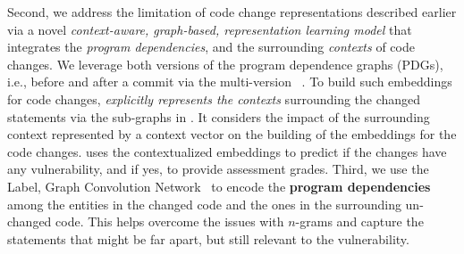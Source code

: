 Second, we address the limitation of code change representations described earlier via 
a novel
{\em context-aware, graph-based, representation learning model} 
that
integrates the {\em program dependencies}, and the surrounding {\em
  contexts} of code changes. We leverage both versions of the program
dependence graphs (PDGs), i.e., before and after a commit via the multi-version {\mvpdg}~\cite{flexeme-fse20}. To build such embeddings
for code changes, {\tool} {\em explicitly represents the contexts}
surrounding the changed statements via the sub-graphs in {\mvpdg}. It
considers the impact of the surrounding context represented by a
context vector on the building of the embeddings for the code
changes. {\tool} uses the contextualized embeddings to predict if the
changes have any vulnerability, and if yes, to provide assessment
grades. Third, we use the Label, Graph Convolution
Network~\cite{label-gcn} to encode the {\bf program dependencies}
among the entities in the changed code and the ones in the surrounding
un-changed code. This helps overcome the issues with $n$-grams and
capture the statements that might be far apart, but still relevant to the
vulnerability.

